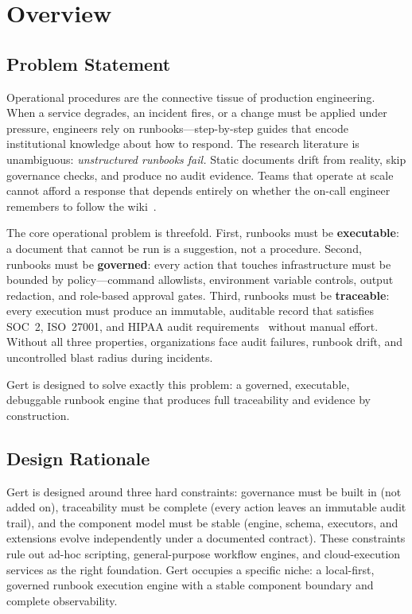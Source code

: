 \chapter{Overview}

\section{Problem Statement}

Operational procedures are the connective tissue of production engineering. When a service degrades,
an incident fires, or a change must be applied under pressure, engineers rely on runbooks---step-by-step
guides that encode institutional knowledge about how to respond. The research literature is unambiguous:
\textit{unstructured runbooks fail.} Static documents drift from reality, skip governance checks, and
produce no audit evidence. Teams that operate at scale cannot afford a response that depends entirely on
whether the on-call engineer remembers to follow the wiki~\cite{ibm-redbook-runbooks,ijsret-runbook-engineering}.

The core operational problem is threefold. First, runbooks must be \textbf{executable}: a document that
cannot be run is a suggestion, not a procedure. Second, runbooks must be \textbf{governed}: every action
that touches infrastructure must be bounded by policy---command allowlists, environment variable
controls, output redaction, and role-based approval gates. Third, runbooks must be \textbf{traceable}:
every execution must produce an immutable, auditable record that satisfies SOC~2, ISO~27001, and HIPAA
audit requirements~\cite{soc2-aicpa,iso27001,hipaa-security-rule} without manual effort. Without all three properties, organizations face audit
failures, runbook drift, and uncontrolled blast radius during incidents.

Gert is designed to solve exactly this problem: a governed, executable, debuggable runbook engine that
produces full traceability and evidence by construction.

\section{Design Rationale}

Gert is designed around three hard constraints: governance must be built in (not added on),
traceability must be complete (every action leaves an immutable audit trail), and the
component model must be stable (engine, schema, executors, and extensions evolve independently
under a documented contract). These constraints rule out ad-hoc scripting, general-purpose
workflow engines, and cloud-execution services as the right foundation. Gert occupies a
specific niche: a local-first, governed runbook execution engine with a stable component
boundary and complete observability.

